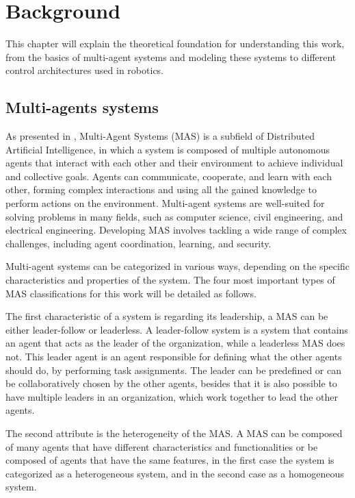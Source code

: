 \def \MOISEp {$\mathcal{M}OISE^+$ }
\def \MOISEpBf {$\mathbf{\mathcal{M}OISE^+}$ }

\chapter{Background}
\label{ch:background}

This chapter will explain the theoretical foundation for understanding this work, from the basics of multi-agent systems and modeling these systems to different control architectures used in robotics.

\section{Multi-agents systems}

As presented in \cite{MASSurvey}, Multi-Agent Systems (MAS) is a subfield of Distributed Artificial Intelligence, in which a system is composed of multiple autonomous agents that interact with each other and their environment to achieve individual and collective goals. Agents can communicate, cooperate, and learn with each other, forming complex interactions and using all the gained knowledge to perform actions on the environment. Multi-agent systems are well-suited for solving problems in many fields, such as computer science, civil engineering, and electrical engineering. Developing MAS involves tackling a wide range of complex challenges, including agent coordination, learning, and security.

Multi-agent systems can be categorized in various ways, depending on the specific characteristics and properties of the system. The four most important types of MAS classifications for this work will be detailed as follows.

The first characteristic of a system is regarding its leadership, a MAS can be either leader-follow or leaderless. A leader-follow system is a system that contains an agent that acts as the leader of the organization, while a leaderless MAS does not. This leader agent is an agent responsible for defining what the other agents should do, by performing task assignments. The leader can be predefined or can be collaboratively chosen by the other agents, besides that it is also possible to have multiple leaders in an organization, which work together to lead the other agents.

The second attribute is the heterogeneity of the MAS. A MAS can be composed of many agents that have different characteristics and functionalities or be composed of agents that have the same features, in the first case the system is categorized as a heterogeneous system, and in the second case as a homogeneous system.

